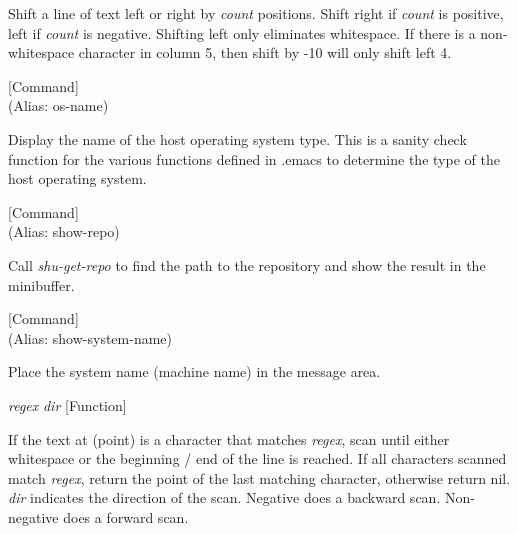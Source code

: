 \begin{doc-string}
Shift a line of text left or right by \emph{count} positions.  Shift right
if \emph{count} is positive, left if \emph{count} is negative.  Shifting left only
eliminates whitespace.  If there is a non-whitespace character in column
5, then shift by -10 will only shift left 4.
\end{doc-string}

\vspace{1em}
\noindent
{}
\usebox{\funcname}
 \hfill [Command]\\%
 (Alias: os-name)

\begin{doc-string}
Display the name of the host operating system type.  This is a sanity check
function for the various functions defined in .emacs to determine the type of
the host operating system.
\end{doc-string}

\vspace{1em}
\noindent
{}
\usebox{\funcname}
 \hfill [Command]\\%
 (Alias: show-repo)

\begin{doc-string}
Call \emph{shu-get-repo} to find the path to the repository and show the result in
the minibuffer.
\end{doc-string}

\vspace{1em}
\noindent
{}
\usebox{\funcname}
 \hfill [Command]\\%
 (Alias: show-system-name)

\begin{doc-string}
Place the system name (machine name) in the message area.
\end{doc-string}

\vspace{1em}
\noindent
{}
\usebox{\funcname}\emph{regex} \emph{dir}
 \hfill [Function]

\begin{doc-string}
If the text at (point) is a character that matches \emph{regex}, scan until either
whitespace or the beginning / end of the line is reached.  If all characters
scanned match \emph{regex}, return the point of the last matching character, otherwise
return nil.  \emph{dir} indicates the direction of the scan.  Negative does a backward
scan.  Non-negative does a forward scan.
\end{doc-string}

